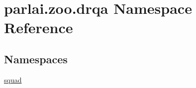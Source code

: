 \hypertarget{namespaceparlai_1_1zoo_1_1drqa}{}\section{parlai.\+zoo.\+drqa Namespace Reference}
\label{namespaceparlai_1_1zoo_1_1drqa}
\subsection*{Namespaces}
\begin{DoxyCompactItemize}
\item 
 \hyperlink{namespaceparlai_1_1zoo_1_1drqa_1_1squad}{squad}
\end{DoxyCompactItemize}
